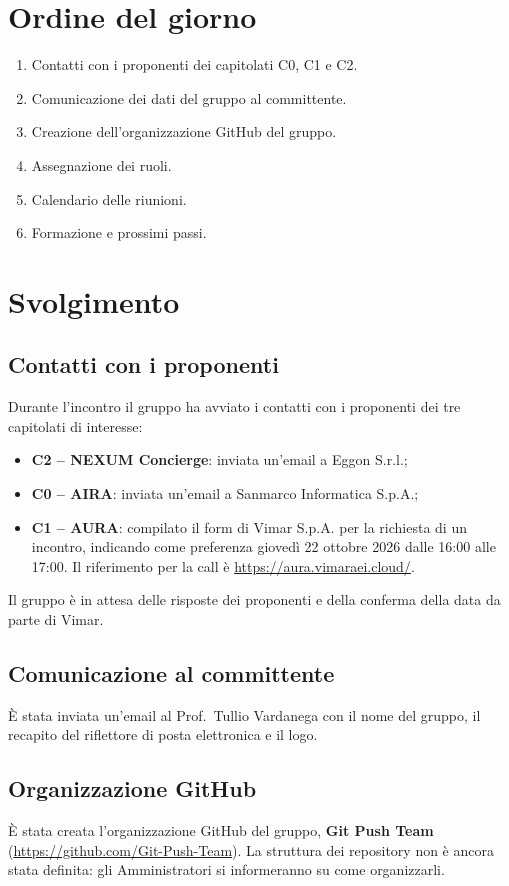 \documentclass[verbale=interno]{gpt}
\begin{document}
\section{Ordine del giorno}
\begin{enumerate}
  \item Contatti con i proponenti dei capitolati C0, C1 e C2.
  \item Comunicazione dei dati del gruppo al committente.
  \item Creazione dell'organizzazione GitHub del gruppo.
  \item Assegnazione dei ruoli.
  \item Calendario delle riunioni.
  \item Formazione e prossimi passi.
\end{enumerate}

\section{Svolgimento}

\subsection{Contatti con i proponenti}
Durante l'incontro il gruppo ha avviato i contatti con i proponenti dei
tre capitolati di interesse:
\begin{itemize}
  \item \textbf{C2 -- NEXUM Concierge}: inviata un'email a Eggon S.r.l.;
  \item \textbf{C0 -- AIRA}: inviata un'email a Sanmarco Informatica S.p.A.;
  \item \textbf{C1 -- AURA}: compilato il form di Vimar S.p.A. per la
    richiesta di un incontro, indicando come preferenza giovedì
    22 ottobre 2026 dalle 16:00 alle 17:00. Il riferimento per la call è
    \url{https://aura.vimaraei.cloud/}.
\end{itemize}
Il gruppo è in attesa delle risposte dei proponenti e della conferma
della data da parte di Vimar.

\subsection{Comunicazione al committente}
È stata inviata un'email al Prof.~Tullio Vardanega con il nome del
gruppo, il recapito del riflettore di posta elettronica e il logo.

\subsection{Organizzazione GitHub}
È stata creata l'organizzazione GitHub del gruppo,
\textbf{Git Push Team} (\url{https://github.com/Git-Push-Team}). La
struttura dei repository non è ancora stata definita: gli
Amministratori si informeranno su come organizzarli.
\end{document}
